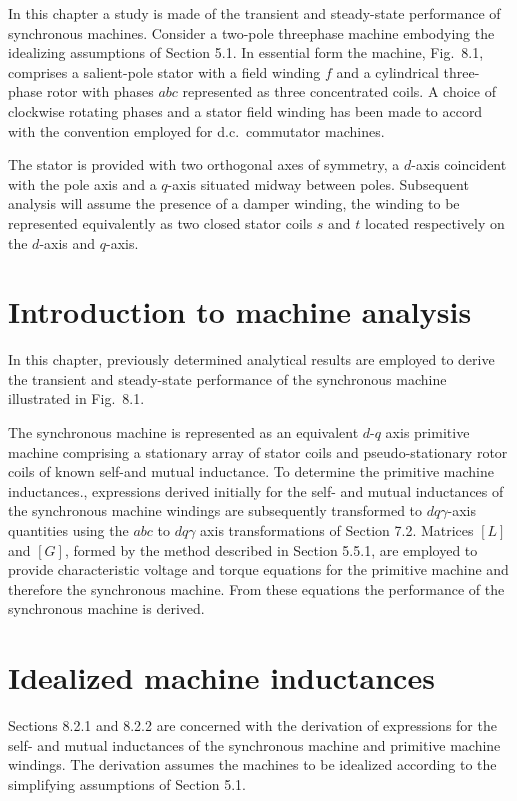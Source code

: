 \documentclass[a4paper,numbers=noenddot,12pt]{scrbook}
\begin{document}
        In this chapter a study is made of the transient and steady-state performance of synchronous machines. Consider a two-pole three­phase machine embodying the idealizing assumptions of Section 5.1. In essential form the machine, Fig.\ 8.1, comprises a salient-pole stator with a field winding $f$ and a cylindrical three-phase rotor with phases $abc$ represented as three concentrated coils. A choice of clockwise rotating phases and a stator field winding has been made to accord with the convention employed for d.c.\ commutator machines.

        The stator is provided with two orthogonal axes of symmetry, a $d$-axis coincident with the pole axis and a $q$-axis situated midway between poles. Subsequent analysis will assume the presence of a damper winding, the winding to be represented equivalently as two closed stator coils $s$ and $t$ located respectively on the $d$-axis and $q$-axis.

        \section{Introduction to machine analysis}
        In this chapter, previously determined analytical results are employed to derive the transient and steady-state performance of the synchronous machine illustrated in Fig.\ 8.1. 

        The synchronous machine is represented as an equivalent $d$-$q$ axis primitive machine comprising a stationary array of stator coils and pseudo-stationary rotor coils of known self-and mutual inductance. To determine the primitive machine inductances., expressions derived initially for the self- and mutual inductances of the synchronous machine windings are subsequently transformed to $d q \gamma$-axis quantities using the $abc$ to $d q \gamma$ axis transformations of Section 7.2. Matrices
        $[L]$ and $[G]$,  formed by the method described in Section 5.5.1, are employed to provide characteristic voltage and torque equations for the primitive machine and therefore the synchronous machine. From these equations the performance of the synchronous machine is derived. 

        \section{Idealized machine inductances}
        Sections 8.2.1 and 8.2.2 are concerned with the derivation of expressions for the self- and mutual inductances of the synchronous machine and primitive machine windings. The derivation assumes the machines to be idealized according to the simplifying assumptions of Section 5.1.
\end{document}

